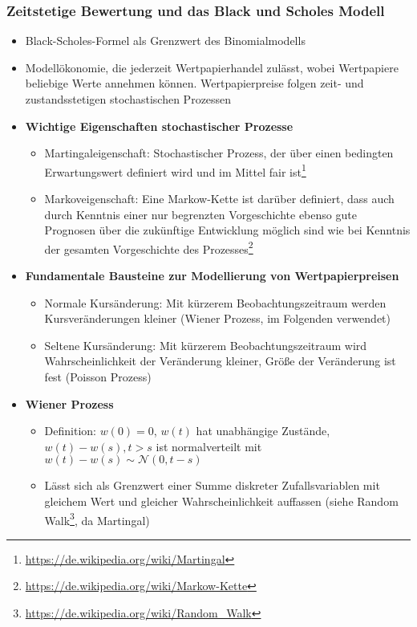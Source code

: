 \subsubsection{Zeitstetige Bewertung und das Black und Scholes Modell}
\begin{itemize}
	\item Black-Scholes-Formel als Grenzwert des Binomialmodells
	\item Modellökonomie, die jederzeit Wertpapierhandel zulässt, wobei Wertpapiere beliebige Werte annehmen können. Wertpapierpreise folgen zeit- und zustandsstetigen stochastischen Prozessen
	\item \textbf{Wichtige Eigenschaften stochastischer Prozesse}
	\begin{itemize}
		\item Martingaleigenschaft: Stochastischer Prozess, der über einen bedingten Erwartungswert definiert wird und im Mittel fair ist\footnote{\url{https://de.wikipedia.org/wiki/Martingal}}
		\item Markoveigenschaft: Eine Markow-Kette ist darüber definiert, dass auch durch Kenntnis einer nur begrenzten Vorgeschichte ebenso gute Prognosen über die zukünftige Entwicklung möglich sind wie bei Kenntnis der gesamten Vorgeschichte des Prozesses\footnote{\url{https://de.wikipedia.org/wiki/Markow-Kette}}
	\end{itemize}
	\item \textbf{Fundamentale Bausteine zur Modellierung von Wertpapierpreisen}
	\begin{itemize}
		\item Normale Kursänderung: Mit kürzerem Beobachtungszeitraum werden Kursveränderungen kleiner (Wiener Prozess, im Folgenden verwendet)
		\item Seltene Kursänderung: Mit kürzerem Beobachtungszeitraum wird Wahrscheinlichkeit der Veränderung kleiner, Größe der Veränderung ist fest (Poisson Prozess)
	\end{itemize}
	\item \textbf{Wiener Prozess}
	\begin{itemize}
		\item Definition: \(w(0)=0\), \(w(t)\) hat unabhängige Zustände, \(w(t)-w(s),t>s\) ist normalverteilt mit \(w(t)-w(s)\sim\mathcal{N}(0,t-s)\)
		\item Lässt sich als Grenzwert einer Summe diskreter Zufallsvariablen mit gleichem Wert und gleicher Wahrscheinlichkeit auffassen (siehe Random Walk\footnote{\url{https://de.wikipedia.org/wiki/Random_Walk}}, da Martingal)

\end{itemize}
\end{itemize}
